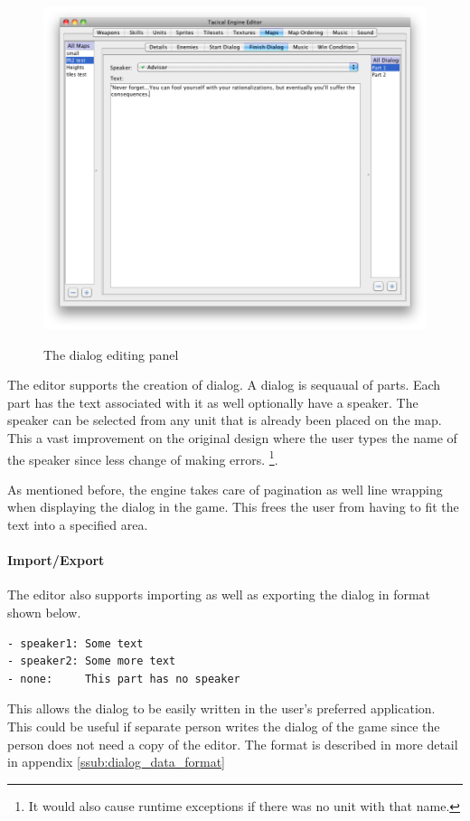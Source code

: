 \begin{figure}[htbp]
		\includegraphics[height=4in]{figures/editor/Maps-dialog.png}
	\caption{The dialog editing panel}
	\label{fig:figures_editor_Maps-dialog}
\end{figure}
The editor supports the creation of dialog.  A dialog is sequaual of parts. Each part has the text  associated with it as well optionally have a speaker.  The speaker can be selected from any unit that is already been placed on the map. This a vast improvement on the original design where the user types the name of the speaker since less change of making errors. \footnote{It would also cause runtime exceptions if there was no unit with that name.}.

As mentioned before, the engine takes care of pagination as well line wrapping when displaying the dialog in the game. This frees the user from having to fit the text into a specified area. 

\paragraph{Import/Export\\}
The editor also supports importing as well as exporting the dialog in format shown below. 
\begin{lstlisting}[caption=Shows the format used  for the dialog]
- speaker1: Some text 
- speaker2: Some more text
- none:     This part has no speaker
\end{lstlisting}
This allows the dialog to be easily written in the user's preferred application.  This could be useful if separate person writes the dialog of the game since the person does not need a copy of the editor. The format is described in more detail in appendix \ref{ssub:dialog_data_format}  

